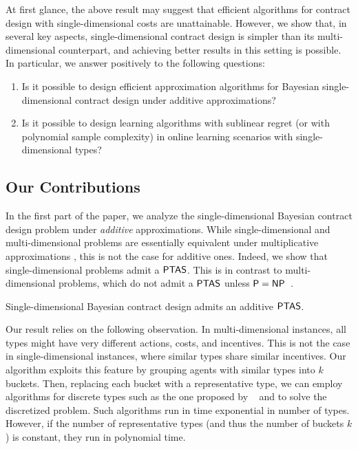 At first glance, the above result may suggest that efficient algorithms for contract design with single-dimensional costs are unattainable.
However, we show that, in several key aspects, single-dimensional contract design is simpler than its multi-dimensional counterpart, and achieving better results in this setting is possible.
%
In particular, we answer positively to the following questions:
\begin{enumerate} 
    \item Is it possible to design efficient approximation algorithms for Bayesian single-dimensional contract design under additive approximations?
    \item Is it possible to design learning algorithms with sublinear regret (or with polynomial sample complexity) in online learning scenarios with single-dimensional types?
\end{enumerate}

\subsection{Our Contributions}

%
In the first part of the paper, we analyze the single-dimensional Bayesian contract design problem under \emph{additive} approximations. While single-dimensional and multi-dimensional problems are essentially equivalent under multiplicative approximations \cite{castiglioni2025reduction}, this is not the case for additive ones.
Indeed, we show that single-dimensional problems admit a $\textsf{PTAS}$. This is in contrast to multi-dimensional problems, which do not admit a $\textsf{PTAS}$ unless $\textsf{P}=\textsf{NP}$~\cite{guruganesh2021contracts, castiglioni2022bayesian}. 

\begin{theorem-non}
    Single-dimensional Bayesian contract design admits an additive $\textsf{PTAS}$.
\end{theorem-non}

Our result relies on the following observation.
In multi-dimensional instances, all types might have very different actions, costs, and incentives. This is not the case in single-dimensional instances, where similar types share similar incentives.
Our algorithm exploits this feature by grouping agents with similar types into $k$ buckets.
Then, replacing each bucket with a representative type, we can employ algorithms for discrete types such as the one proposed by ~\citet{guruganesh2021contracts} and \citet{castiglioni2022bayesian} to solve the discretized problem. Such algorithms run in time exponential in number of types. However, if the number of representative types (and thus the number of buckets $k$) is constant, they run in polynomial time.

